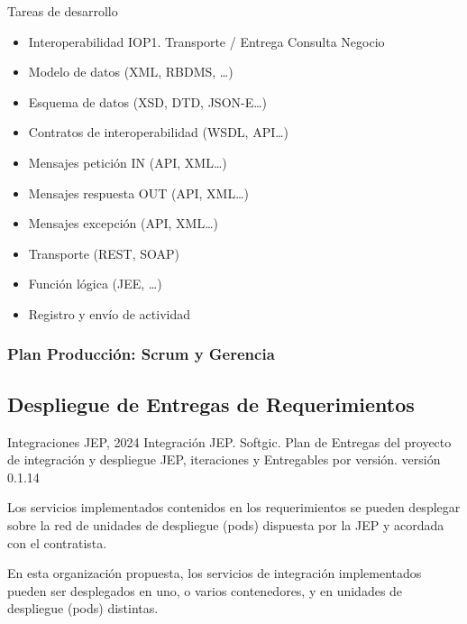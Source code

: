 \documentclass[
  paper=a4,
  ,captions=tableheading
]{scrartcl}
\providecommand{\tightlist}{%
  \setlength{\itemsep}{0pt}\setlength{\parskip}{0pt}}
\renewenvironment{quote}{\begin{customblockquote}\list{}{\rightmargin=0em\leftmargin=0em}%
\item\relax\color{blockquote-text}\ignorespaces}{\unskip\unskip\endlist\end{customblockquote}}
\begin{document}
Tareas de desarrollo

\begin{itemize}
\tightlist
\item
  Interoperabilidad IOP1. Transporte / Entrega Consulta Negocio
\item
  Modelo de datos (XML, RBDMS, \ldots)
\item
  Esquema de datos (XSD, DTD, JSON-E\ldots)
\item
  Contratos de interoperabilidad (WSDL, API\ldots)
\item
  Mensajes petición IN (API, XML\ldots)
\item
  Mensajes respuesta OUT (API, XML\ldots)
\item
  Mensajes excepción (API, XML\ldots)
\item
  Transporte (REST, SOAP)
\item
  Función lógica (JEE, \ldots)
\item
  Registro y envío de actividad
\end{itemize}

\subsubsection{Plan Producción: Scrum y
Gerencia}\label{sec:plan-producciuxf3n-scrum-y-gerencia-1}

\subsection{Despliegue de Entregas de
Requerimientos}\label{sec:despliegue-de-entregas-de-requerimientos}

\begin{quote}
Integraciones JEP, 2024 Integración JEP. Softgic. Plan de Entregas del
proyecto de integración y despliegue JEP, iteraciones y Entregables por
versión. versión 0.1.14
\end{quote}

Los servicios implementados contenidos en los requerimientos se pueden
desplegar sobre la red de unidades de despliegue (pods) dispuesta por la
JEP y acordada con el contratista.

En esta organización propuesta, los servicios de integración
implementados pueden ser desplegados en uno, o varios contenedores, y en
unidades de despliegue (pods) distintas.
\end{document}
